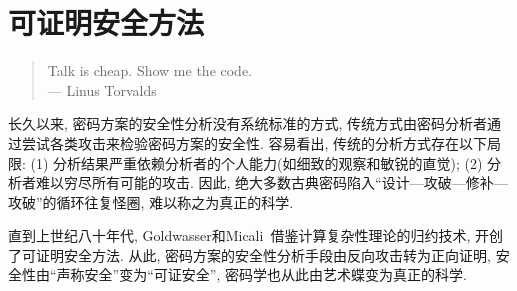 \section{可证明安全方法}

\begin{quote}
Talk is cheap. Show me the code.\\
\hspace*{\fill} --- Linus Torvalds 
\end{quote}

长久以来, 密码方案的安全性分析没有系统标准的方式, 传统方式由密码分析者通过尝试各类攻击来检验密码方案的安全性. 
容易看出, 传统的分析方式存在以下局限: 
(1) 分析结果严重依赖分析者的个人能力(如细致的观察和敏锐的直觉); (2) 分析者难以穷尽所有可能的攻击. 
因此, 绝大多数古典密码陷入``设计—攻破—修补—攻破''的循环往复怪圈, 难以称之为真正的科学. 

直到上世纪八十年代, Goldwasser和Micali~\cite{GM-STOC-1982}借鉴计算复杂性理论的归约技术, 开创了可证明安全方法. 
从此, 密码方案的安全性分析手段由反向攻击转为正向证明, 安全性由``声称安全''变为``可证安全'', 密码学也从此由艺术蝶变为真正的科学. 

